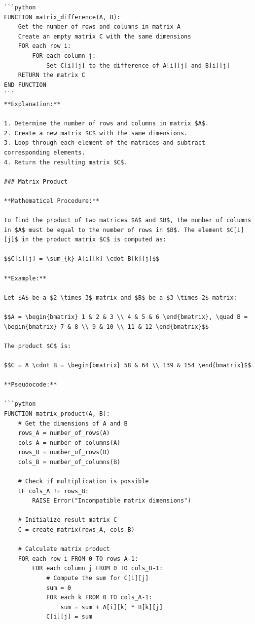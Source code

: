 \documentclass[
  letterpaper,
  DIV=11,
  numbers=noendperiod]{scrreprt}
\theoremstyle{plain}
\theoremstyle{definition}
\theoremstyle{remark}
\begin{document}
\begin{verbatim}
```python
FUNCTION matrix_difference(A, B):
    Get the number of rows and columns in matrix A
    Create an empty matrix C with the same dimensions
    FOR each row i:
        FOR each column j:
            Set C[i][j] to the difference of A[i][j] and B[i][j]
    RETURN the matrix C
END FUNCTION
```
**Explanation:**

1. Determine the number of rows and columns in matrix $A$.
2. Create a new matrix $C$ with the same dimensions.
3. Loop through each element of the matrices and subtract corresponding elements.
4. Return the resulting matrix $C$.

### Matrix Product

**Mathematical Procedure:**

To find the product of two matrices $A$ and $B$, the number of columns in $A$ must be equal to the number of rows in $B$. The element $C[i][j]$ in the product matrix $C$ is computed as:

$$C[i][j] = \sum_{k} A[i][k] \cdot B[k][j]$$

**Example:**

Let $A$ be a $2 \times 3$ matrix and $B$ be a $3 \times 2$ matrix:

$$A = \begin{bmatrix} 1 & 2 & 3 \\ 4 & 5 & 6 \end{bmatrix}, \quad B = \begin{bmatrix} 7 & 8 \\ 9 & 10 \\ 11 & 12 \end{bmatrix}$$

The product $C$ is:

$$C = A \cdot B = \begin{bmatrix} 58 & 64 \\ 139 & 154 \end{bmatrix}$$

**Pseudocode:**

```python
FUNCTION matrix_product(A, B):
    # Get the dimensions of A and B
    rows_A = number_of_rows(A)
    cols_A = number_of_columns(A)
    rows_B = number_of_rows(B)
    cols_B = number_of_columns(B)
    
    # Check if multiplication is possible
    IF cols_A != rows_B:
        RAISE Error("Incompatible matrix dimensions")
    
    # Initialize result matrix C
    C = create_matrix(rows_A, cols_B)
    
    # Calculate matrix product
    FOR each row i FROM 0 TO rows_A-1:
        FOR each column j FROM 0 TO cols_B-1:
            # Compute the sum for C[i][j]
            sum = 0
            FOR each k FROM 0 TO cols_A-1:
                sum = sum + A[i][k] * B[k][j]
            C[i][j] = sum
    

\end{verbatim}
\end{document}
